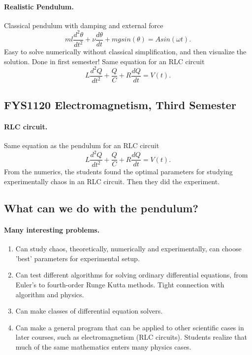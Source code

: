 \documentclass[%
twoside,                 %
final,                   %
10pt]{article}
\begin{document}
\paragraph{Realistic Pendulum.}

Classical pendulum with damping and external force
\[
  ml\frac{d^2\theta}{dt^2}+\nu\frac{d\theta}{dt}  +mgsin(\theta)=Asin(\omega t).
\]
Easy to solve numerically without classical simplification, and then visualize the solution.  Done in first semester!
Same equation for an RLC circuit 
\[
L\frac{d^2Q}{dt^2}+\frac{Q}{C}+R\frac{dQ}{dt}=V(t).
\]




\subsection{FYS1120 Electromagnetism, Third Semester}

\paragraph{RLC circuit.}
Same equation as the pendulum for an RLC circuit 
\[
L\frac{d^2Q}{dt^2}+\frac{Q}{C}+R\frac{dQ}{dt}=V(t).
\]
From the numerics, 
the students found the optimal parameters for studying experimentally chaos
in an RLC circuit. Then they did the experiment.






\subsection{What can we do with the pendulum?}

\paragraph{Many interesting problems.}

\begin{enumerate}
\item Can study chaos, theoretically, numerically and experimentally, can choose 'best' parameters  for experimental setup.

\item Can test different algorithms for solving ordinary differential equations, from Euler's to fourth-order Runge Kutta methods. Tight connection with algorithm and physics.

\item Can make classes of differential equation solvers.

\item Can make a general program that can be applied to other scientific cases in later courses, such as electromagnetism (RLC circuits).  Students realize that much of the same mathematics enters many physics cases.
\end{enumerate}
\end{document}
